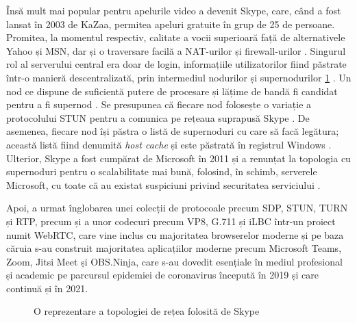 \indent \par Însă mult mai popular pentru apelurile video a devenit Skype, care, când a fost lansat în 2003 de KaZaa, permitea apeluri gratuite în grup de 25 de persoane. Promitea, la momentul respectiv, calitate a vocii superioară față de alternativele Yahoo și MSN, dar și o traversare facilă a NAT-urilor și firewall-urilor \cite{Baset2004}. Singurul rol al serverului central era doar de login, informațiile utilizatorilor fiind păstrate într-o manieră descentralizată, prin intermediul nodurilor și supernodurilor \ref{SkypeNet} \cite{Baset2004}. Un nod ce dispune de suficientă putere de procesare și lățime de bandă fi candidat pentru a fi supernod \cite{Baset2004}. Se presupunea că fiecare nod folosește o variație a protocolului STUN pentru a comunica pe rețeaua suprapusă Skype \cite{Baset2004}. De asemenea, fiecare nod își păstra o listă de supernoduri cu care să facă legătura; această listă fiind denumită \textit{host cache} și este păstrată în registrul Windows \cite{Baset2004}. Ulterior, Skype a fost cumpărat de Microsoft în 2011 și a renunțat la topologia cu supernoduri pentru o scalabilitate mai bună, folosind, în schimb, serverele Microsoft, cu toate că au existat suspiciuni privind securitatea serviciului \cite{Whittaker2013}.
\indent \par Apoi, a urmat înglobarea unei colecții de protocoale precum SDP, STUN, TURN și RTP, precum și a unor codecuri precum VP8, G.711 și iLBC într-un proiect numit WebRTC, care vine inclus cu majoritatea browserelor moderne și pe baza căruia s-au construit majoritatea aplicațiilor moderne precum Microsoft Teams, Zoom, Jitsi Meet și OBS.Ninja, care s-au dovedit esențiale în mediul profesional și academic pe parcursul epidemiei de coronavirus începută în 2019 și care continuă și în 2021.
\begin{figure}
    \centering
    \scalebox{0.75}{}
    \caption{O reprezentare a topologiei de rețea folosită de Skype}
    \label{SkypeNet}
\end{figure}